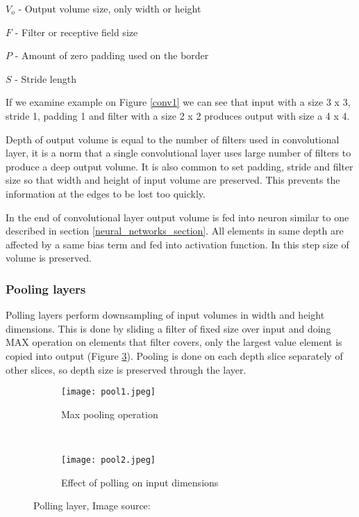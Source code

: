 $V_{o}$ - Output volume size, only width or height

$F$ - Filter or receptive field size

$P$ - Amount of zero padding used on the border

$S$ - Stride length

If we examine example on Figure \ref{conv1} we can see that input with a size 3 x 3, stride 1, padding 1 and filter with a size 2 x 2 produces output with size a 4 x 4.

Depth of output volume is equal to the number of filters used in convolutional layer, it is a norm that a single convolutional layer uses large number of filters to produce a deep output volume\cite{cs231n}.
It is also common to set padding, stride and filter size so that width and height of input volume are preserved.
This prevents the information at the edges to be lost too quickly\cite{cs231n}.

In the end of convolutional layer output volume is fed into neuron similar to one described in section \ref{neural_networks_section}. 
All elements in same depth are affected by a same bias term and fed into activation function.
In this step size of volume is preserved.

\subsubsection{ Pooling layers}

Polling layers perform downsampling of input volumes in width and height dimensions.
This is done by sliding a filter of fixed size over input and doing MAX operation on elements that filter covers, only the largest value element is copied into output (Figure \ref{pool_layer}).
Pooling is done on each depth slice separately of other slices, so depth size is preserved through the layer.

\begin{figure}[ht] 
    \begin{subfigure}[b]{0.5\textwidth}
        \centering
        \texttt{[image: pool1.jpeg]} 
        \caption{Max pooling operation}
        \label{pool1}
    \end{subfigure}
    \unskip\ \vrule\ 
    \begin{subfigure}[b]{0.5\textwidth}
        \centering
        \texttt{[image: pool2.jpeg]} 
        \caption{ Effect of polling on input dimensions}
        \label{pool2}
    \end{subfigure}
    \caption{ Polling layer, Image source: \cite{cs231n}}
    \label{pool_layer}
\end{figure}

